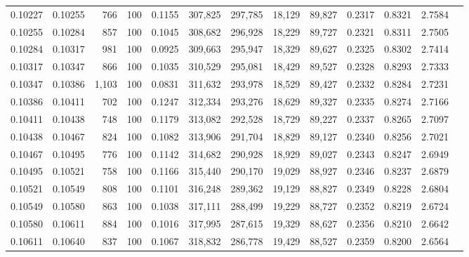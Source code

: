 \begin{tabular}{rrrrrrrrrrrrr}
0.10227 & 0.10255 &   766 & 100 &                                     0.1155 & 307,825 & 297,785 &  18,129 &  89,827 & 0.2317 & 0.8321 & 2.7584 \\
0.10255 & 0.10284 &   857 & 100 &                                     0.1045 & 308,682 & 296,928 &  18,229 &  89,727 & 0.2321 & 0.8311 & 2.7505 \\
0.10284 & 0.10317 &   981 & 100 &                                     0.0925 & 309,663 & 295,947 &  18,329 &  89,627 & 0.2325 & 0.8302 & 2.7414 \\
0.10317 & 0.10347 &   866 & 100 &                                     0.1035 & 310,529 & 295,081 &  18,429 &  89,527 & 0.2328 & 0.8293 & 2.7333 \\
0.10347 & 0.10386 & 1,103 & 100 &                                     0.0831 & 311,632 & 293,978 &  18,529 &  89,427 & 0.2332 & 0.8284 & 2.7231 \\
0.10386 & 0.10411 &   702 & 100 &                                     0.1247 & 312,334 & 293,276 &  18,629 &  89,327 & 0.2335 & 0.8274 & 2.7166 \\
0.10411 & 0.10438 &   748 & 100 &                                     0.1179 & 313,082 & 292,528 &  18,729 &  89,227 & 0.2337 & 0.8265 & 2.7097 \\
0.10438 & 0.10467 &   824 & 100 &                                     0.1082 & 313,906 & 291,704 &  18,829 &  89,127 & 0.2340 & 0.8256 & 2.7021 \\
0.10467 & 0.10495 &   776 & 100 &                                     0.1142 & 314,682 & 290,928 &  18,929 &  89,027 & 0.2343 & 0.8247 & 2.6949 \\
0.10495 & 0.10521 &   758 & 100 &                                     0.1166 & 315,440 & 290,170 &  19,029 &  88,927 & 0.2346 & 0.8237 & 2.6879 \\
0.10521 & 0.10549 &   808 & 100 &                                     0.1101 & 316,248 & 289,362 &  19,129 &  88,827 & 0.2349 & 0.8228 & 2.6804 \\
0.10549 & 0.10580 &   863 & 100 &                                     0.1038 & 317,111 & 288,499 &  19,229 &  88,727 & 0.2352 & 0.8219 & 2.6724 \\
0.10580 & 0.10611 &   884 & 100 &                                     0.1016 & 317,995 & 287,615 &  19,329 &  88,627 & 0.2356 & 0.8210 & 2.6642 \\
0.10611 & 0.10640 &   837 & 100 &                                     0.1067 & 318,832 & 286,778 &  19,429 &  88,527 & 0.2359 & 0.8200 & 2.6564 \\

\end{tabular}
